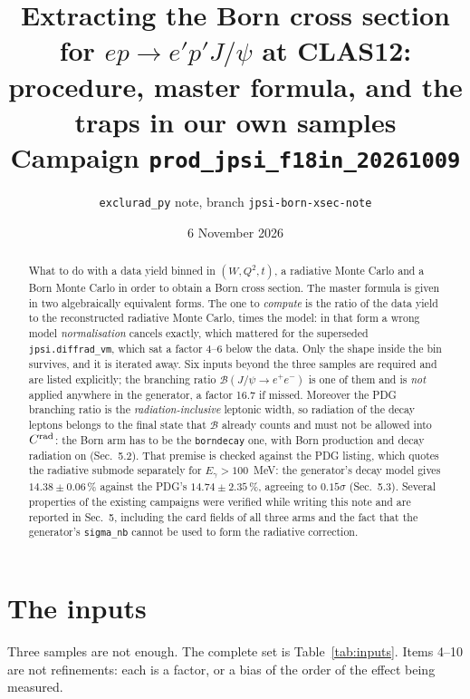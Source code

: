 \documentclass[11pt]{article}
\title{Extracting the Born cross section for $ep\to e'p'J/\psi$ at CLAS12:\\
procedure, master formula, and the traps in our own samples\\[4pt]
\large Campaign \texttt{prod\_jpsi\_f18in\_20261009}}
\author{\texttt{exclurad\_py} note, branch \texttt{jpsi-born-xsec-note}}
\date{6 November 2026}
\newcommand{\crad}{C^{\rm rad}}
\newcommand{\BR}{\mathcal{B}}
\begin{document}
\maketitle

\begin{abstract}
What to do with a data yield binned in $(W,Q^2,t)$, a radiative Monte Carlo and a Born Monte Carlo
in order to obtain a Born cross section. The master formula is given in two algebraically equivalent
forms. The one to \emph{compute} is the ratio of the data yield to the reconstructed radiative
Monte Carlo, times the model: in that form a wrong model \emph{normalisation} cancels exactly, which
mattered for the superseded \texttt{jpsi.diffrad\_vm}, which sat a factor 4--6 below the data. Only the shape
inside the bin survives, and it is iterated away. Six inputs beyond the three samples are required
and are listed explicitly; the branching ratio $\BR(J/\psi\to e^+e^-)$ is one of them and is
\emph{not} applied anywhere in the generator, a factor 16.7 if missed. Moreover the PDG branching
ratio is the \emph{radiation-inclusive} leptonic width, so radiation of the decay leptons belongs to
the final state that $\BR$ already counts and must not be allowed into $\crad$: the Born arm has to be
the \texttt{borndecay} one, with Born production and decay radiation on (Sec.~5.2). That premise is
checked against the PDG listing, which quotes the radiative submode separately for
$E_\gamma>100$~MeV: the generator's decay model gives $14.38\pm0.06\,\%$ against the PDG's
$14.74\pm2.35\,\%$, agreeing to $0.15\sigma$ (Sec.~5.3). Several properties of the existing campaigns
were verified while writing this note and are reported in Sec.~5, including the card fields of all
three arms and the fact that the generator's \texttt{sigma\_nb} cannot be used to form the radiative
correction.
\end{abstract}

\section{The inputs}

Three samples are not enough. The complete set is Table~\ref{tab:inputs}. Items 4--10 are not
refinements: each is a factor, or a bias of the order of the effect being measured.
\end{document}
